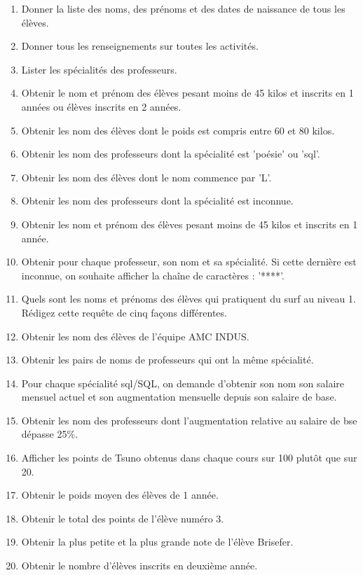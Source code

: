 \documentclass{report}
\begin{document}
\begin{enumerate}
	\item Donner la liste des noms, des prénoms et des dates de naissance de tous les élèves.
	\item Donner tous les renseignements sur toutes les activités.
	\item Lister les spécialités des professeurs.
	\item Obtenir le nom et prénom des élèves pesant moins de 45 kilos et inscrits en 1 années ou élèves inscrits en 2 années.
	\item Obtenir les nom des élèves dont le poids est compris entre 60 et 80 kilos.
	\item Obtenir les nom des professeurs dont la spécialité est 'poésie' ou 'sql'.
	\item Obtenir les nom des élèves dont le nom commence par 'L'.
	\item Obtenir les nom des professeurs dont la spécialité est inconnue.
	\item Obtenir les nom et prénom des élèves pesant moins de 45 kilos et inscrits en 1 année.
	\item Obtenir pour chaque professeur, son nom et sa spécialité. Si cette dernière est inconnue, on souhaite afficher la chaîne de caractères : '****'.
	\item Quels sont les noms et prénoms des élèves qui pratiquent du surf au niveau 1. Rédigez cette requête de cinq façons différentes.
	\item Obtenir les nom des élèves de l'équipe AMC INDUS.
	\item Obtenir les pairs de noms de professeurs qui ont la même spécialité.
	\item Pour chaque spécialité sql/SQL, on demande d'obtenir son nom son salaire mensuel actuel et son augmentation mensuelle depuis son salaire de base.
	\item Obtenir les nom des professeurs dont l'augmentation relative au salaire de bse dépasse 25\%.
	\item Afficher les points de Tsuno obtenus dans chaque cours sur 100 plutôt que sur 20.
	\item Obtenir le poids moyen des élèves de 1 année.
	\item Obtenir le total des points de l'élève numéro 3.
	\item Obtenir la plus petite et la plus grande note de l'élève Brisefer.
	\item Obtenir le nombre d'élèves inscrits en deuxième année.

\end{enumerate}
\end{document}
